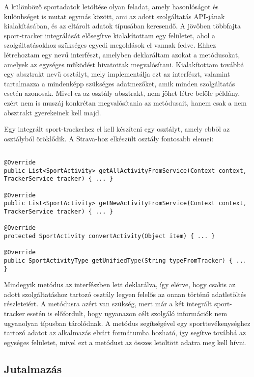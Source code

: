 A különböző sportadatok letöltése olyan feladat, amely hasonlóságot és különbséget is mutat egymás között, ami az adott szolgáltatás API-jának kialakításában, és az eltárolt adatok típusában keresendő. 
A jövőben többfajta sport-tracker integrálását elősegítve kialakítottam egy felületet, ahol a szolgáltatásokhoz szükséges egyedi megoldások el vannak fedve. 
Ehhez létrehoztam egy  nevű interfészt, amelyben deklaráltam azokat a metódusokat, amelyek az egységes működést hivatottak megvalósítani. 
Kialakítottam továbbá egy absztrakt   nevű osztályt, mely implementálja ezt az interfészt, valamint tartalmazza a mindenképp szükséges adatmezőket, amik minden szolgáltatás esetén azonosak. 
Mivel ez az osztály absztrakt, nem jöhet létre belőle példány, ezért nem is muszáj konkrétan megvalósítania az  metódusait, hanem csak a nem absztrakt gyerekeinek kell majd. 

Egy integrált sport-trackerhez el kell készíteni egy osztályt, amely ebből az osztályból öröklődik. 
A Strava-hoz elkészült osztály fontosabb elemei:

\begin{lstlisting}

@Override
public List<SportActivity> getAllActivityFromService(Context context, TrackerService tracker) { ... }

@Override
public List<SportActivity> getNewActivityFromService(Context context, TrackerService tracker) { ... }

@Override
protected SportActivity convertActivity(Object item) { ... }

@Override
public SportActivityType getUnifiedType(String typeFromTracker) { ... }

\end{lstlisting}

Mindegyik metódus az interfészben lett deklarálva, így elérve, hogy csakis az adott szolgáltatáshoz tartozó osztály legyen felelős az onnan történő adatletöltés részleteiért. 
A  metódusra azért van szükség, mert már a két integrált sport-tracker esetén is előfordult, hogy ugyanazon célt szolgáló információk nem ugyanolyan típusban tárolódnak. 
A metódus segítségével egy sporttevékenységhez tartozó adatot az alkalmazás elvárt formátumba hozható, így segítve továbbá az egységes felületet, mivel ezt a metódust az összes letöltött adatra meg kell hívni. 

\subsection*{Jutalmazás}
\label{reward}

